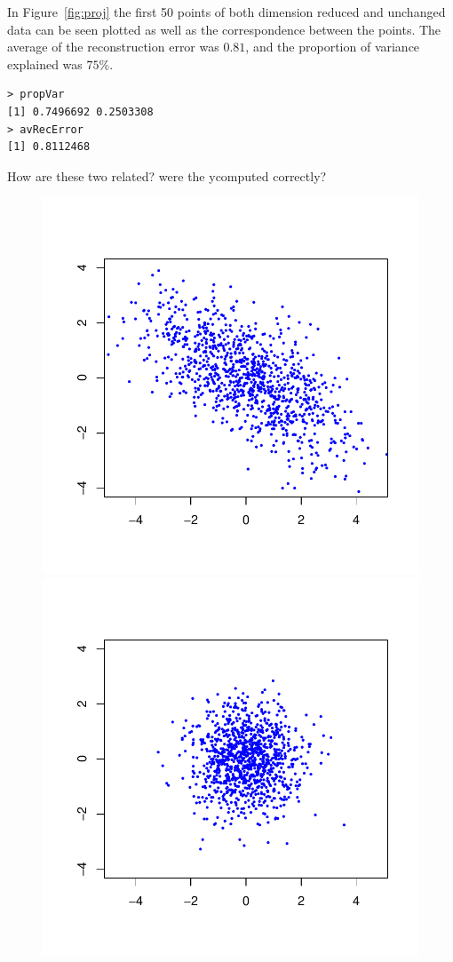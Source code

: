 \documentclass{article}
\begin{document}
In Figure~\ref{fig:proj} the first 50 points of both dimension reduced
and unchanged data can be seen plotted as well as the correspondence
between the points. The average of the reconstruction error was
$0.81$, and the proportion of variance explained was $75 \%$. 
\begin{verbatim}
> propVar
[1] 0.7496692 0.2503308
> avRecError
[1] 0.8112468
\end{verbatim}
How are these two related? were the ycomputed correctly?

\newcommand{\sscale}{0.5}
\begin{figure}\centering
	\includegraphics[scale=\sscale]{scatter1}
	\includegraphics[scale=\sscale]{scatter2}


\end{figure}
\end{document}
